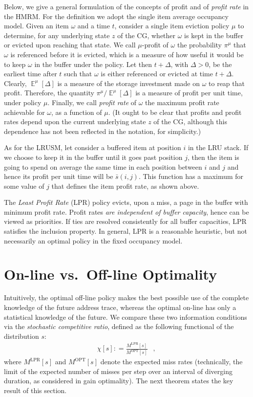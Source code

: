 \documentclass[11pt,a4paper]{article}
\DeclareMathOperator{\E}{\mathbb{E}}
\DeclareMathOperator{\opt}{OPT}
\DeclareMathOperator{\lpr}{LPR}
\DeclareMathOperator{\mc}{\enspace ,}
\newcommand{\deq}{\mathrel{\mathop:}=}
\theoremstyle{definition}
\theoremstyle{remark}
\begin{document}
Below, we give a general formulation of the concepts of profit and of
\emph{profit rate} in the HMRM. For the definition we adopt the single item
average occupancy model. Given an item $\omega$ and a time $t$,
consider a single item eviction policy $\mu$ to determine, for any
underlying state $z$ of the CG, whether $\omega$ is kept in the buffer
or evicted upon reaching that state.  We call $\mu$-profit of $\omega$
the probability $\pi^{\mu}$ that $\omega$ is referenced before it is
evicted, which is a measure of how useful it would be to keep $\omega$
in the buffer under the policy. Let then $t+\Delta$, with $\Delta>0$,
be the earliest time after $t$ such that $\omega$ is either referenced
or evicted at time $t+\Delta$.  Clearly, $\E^{\mu}[\Delta]$ is a
measure of the storage investment made on $\omega$ to reap that
profit.  Therefore, the quantity $\pi^{\mu}/ \E^{\mu}[\Delta]$ is a
measure of profit per unit time, under policy $\mu$.  Finally, we call
\emph{profit rate} of $\omega$ the maximum profit rate achievable for
$\omega$, as a function of $\mu$.
(It ought to be clear that profits and profit rates depend upon the current
underlying state $z$ of the CG, although this dependence has not been reflected
in the notation, for simplicity.)

As for the LRUSM, let consider a buffered item at position $i$ in the
LRU stack. If we choose to keep it in the buffer until it goes past
position $j$, then the item is going to spend on average the same time
in each position between $i$ and $j$ and hence its profit per unit
time will be $\bar s(i,j)$.  This function has a maximum for some
value of $j$ that defines the item profit rate, as shown above.

The \emph{Least Profit Rate} (LPR) policy evicts, upon a miss, a page
in the buffer with minimum profit rate.  Profit rates \emph{are
independent of buffer capacity}, hence can be viewed as priorities. If
ties are resolved consistently for all buffer capacities, LPR
satisfies the inclusion property. In general, LPR is a reasonable
heuristic, but not necessarily an optimal policy in the fixed
occupancy model.

\section{On-line vs.\ Off-line Optimality}
\label{sec:olol}
Intuitively, the optimal off-line policy makes the best possible use
of the complete knowledge of the future address trace, whereas the
optimal on-line has only a statistical knowledge of the future. We
compare these two information conditions via the \emph{stochastic
competitive ratio}, defined as the following functional of the
distribution $s$:
\begin{align}
  \chi[s] \deq \frac{M^{\lpr}[s]}{M^{\opt}[s]}\mc
\end{align}
where $M^{\lpr}[s]$ and $M^{\opt}[s]$ denote the expected miss rates
(technically, the limit of the expected number of misses per step over
an interval of diverging duration, as considered in gain
optimality). The next theorem states the key result of this section.
\end{document}
